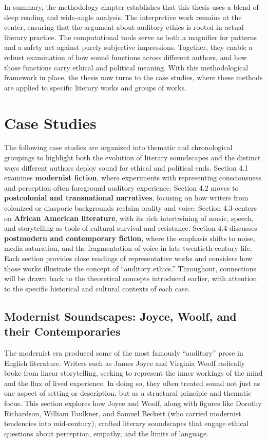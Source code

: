 \documentclass[12pt]{report}
\begin{document}
In summary, the methodology chapter establishes that this thesis uses a blend of deep reading and wide-angle analysis. The interpretive work remains at the center, ensuring that the argument about auditory ethics is rooted in actual literary practice. The computational tools serve as both a magnifier for patterns and a safety net against purely subjective impressions. Together, they enable a robust examination of how sound functions across different authors, and how those functions carry ethical and political meaning. With this methodological framework in place, the thesis now turns to the case studies, where these methods are applied to specific literary works and groups of works.

\chapter{Case Studies}
\label{chap:case-studies}
The following case studies are organized into thematic and chronological groupings to highlight both the evolution of literary soundscapes and the distinct ways different authors deploy sound for ethical and political ends. Section 4.1 examines \textbf{modernist fiction}, where experiments with representing consciousness and perception often foreground auditory experience. Section 4.2 moves to \textbf{postcolonial and transnational narratives}, focusing on how writers from colonized or diasporic backgrounds reclaim orality and voice. Section 4.3 centers on \textbf{African American literature}, with its rich intertwining of music, speech, and storytelling as tools of cultural survival and resistance. Section 4.4 discusses \textbf{postmodern and contemporary fiction}, where the emphasis shifts to noise, media saturation, and the fragmentation of voice in late twentieth-century life. Each section provides close readings of representative works and considers how those works illustrate the concept of “auditory ethics.” Throughout, connections will be drawn back to the theoretical concepts introduced earlier, with attention to the specific historical and cultural contexts of each case.

\section{Modernist Soundscapes: Joyce, Woolf, and their Contemporaries}
The modernist era produced some of the most famously “auditory” prose in English literature. Writers such as James Joyce and Virginia Woolf radically broke from linear storytelling, seeking to represent the inner workings of the mind and the flux of lived experience. In doing so, they often treated sound not just as one aspect of setting or description, but as a structural principle and thematic focus. This section explores how Joyce and Woolf, along with figures like Dorothy Richardson, William Faulkner, and Samuel Beckett (who carried modernist tendencies into mid-century), crafted literary soundscapes that engage ethical questions about perception, empathy, and the limits of language.
\end{document}
